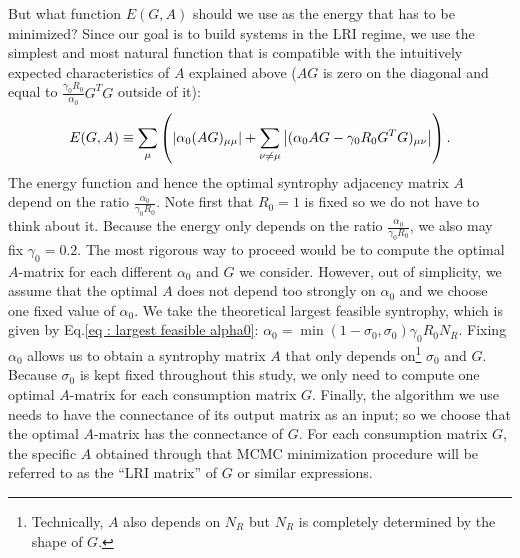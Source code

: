 \documentclass[12pt, titlepage]{report}
\begin{document}
But what function $E(G,A)$ should we use as the energy that has to be minimized? Since our goal is to build systems in the LRI regime, we use the simplest and most natural function that is compatible with the intuitively expected characteristics of $A$ explained above (\ie $AG$ is zero on the diagonal and equal to $\frac{\gamma_0 R_0}{\alpha_0} G^TG$ outside of it):
\begin{equation}
E(G,A) \equiv \sum_\mu \left( \left|{\alpha_0(AG)_{\mu\mu}}\right| + \sum_{\nu\neq\mu} \left|{(\alpha_0 AG-\gamma_0 R_0 G^TG)_{\mu\nu} }\right|\right). \label{eq: dynamical stability methods LRI MC solver energy definition}
\end{equation}
The energy function and hence the optimal syntrophy adjacency matrix $A$ depend on the ratio $\frac{\alpha_0}{\gamma_0 R_0}$. Note first that $R_0=1$ is fixed so we do not have to think about it. Because the energy only depends on the ratio $\frac{\alpha_0}{\gamma_0 R_0}$, we also may fix $\gamma_0=0.2$. The most rigorous way to proceed would be to compute the optimal $A$-matrix for each different $\alpha_0$ and $G$ we consider. However,
out of simplicity, we assume that the optimal $A$ does not depend too strongly on $\alpha_0$ and we choose one fixed value of $\alpha_0$. We take the theoretical largest feasible syntrophy, which is given by Eq.\eqref{eq : largest feasible alpha0}: $\alpha_0 = \min(1-\sigma_0, \sigma_0) \gamma_0 R_0 N_R$. Fixing $\alpha_0$ allows us to obtain a syntrophy matrix $A$ that only depends on\footnote{Technically, $A$ also depends on $N_R$ but $N_R$ is completely determined by the shape of $G$.} $\sigma_0$ and $G$. Because $\sigma_0$ is kept fixed throughout this study, we only need to compute one optimal $A$-matrix for each consumption matrix $G$. Finally, the algorithm we use needs to have the connectance of its output matrix as an input; so we choose that the optimal $A$-matrix has the connectance of $G$. For each consumption matrix $G$, the specific $A$ obtained through that MCMC minimization procedure will be referred to as the ``LRI matrix'' of $G$ or similar expressions.
\end{document}
